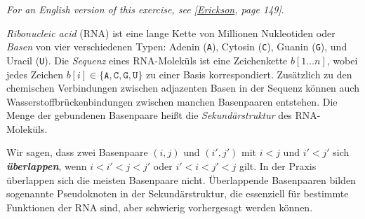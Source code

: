 \documentclass{uebung_cs}
\begin{document}
\textit{\footnotesize For an English version of this exercise, see [\href{https://jeffe.cs.illinois.edu/teaching/algorithms/book/Algorithms-JeffE.pdf}{Erickson}, page 149]}.

\emph{Ribonucleic acid} (RNA) ist eine lange Kette von Millionen Nukleotiden oder \emph{Basen} von vier verschiedenen Typen:
Adenin (\verb|A|), Cytosin (\verb|C|), Guanin (\verb|G|), und Uracil (\verb|U|). Die \emph{Sequenz} eines RNA-Moleküls ist eine Zeichenkette $b[1\dots n]$, wobei jedes Zeichen $b[i]\in\{\texttt{A}, \texttt{C}, \texttt{G}, \texttt{U}\}$ zu einer Basis korrespondiert.
Zusätzlich zu den chemischen Verbindungen zwischen adjazenten Basen in der Sequenz können auch Wasserstoffbrückenbindungen zwischen manchen Basenpaaren entstehen.
Die Menge der gebundenen Basenpaare heißt die \emph{Sekundärstruktur} des RNA-Moleküls.

Wir sagen, dass zwei Basenpaare $(i,j)$ und $(i',j')$ mit $i<j$ und $i'<j'$ sich \textbf{\emph{überlappen}}, wenn $i<i'<j<j'$ oder $i'<i<j'<j$ gilt. In der Praxis überlappen sich die meisten Basenpaare nicht. Überlappende Basenpaaren bilden sogenannte Pseudoknoten in der Sekundärstruktur, die essenziell für bestimmte Funktionen der RNA sind, aber schwierig vorhergesagt werden können.
\end{document}
